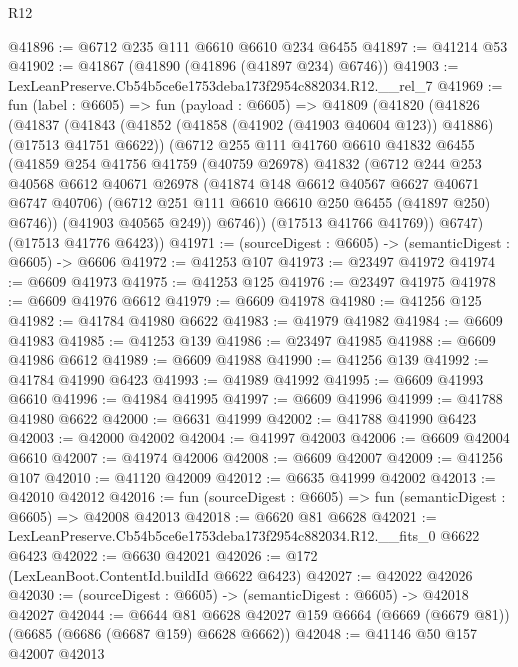 \begin{lexlean}{R12}
\begin{coremodule}
@41896 := @6712 @235 @111 @6610 @6610 @234 @6455
@41897 := @41214 @53
@41902 := @41867 (@41890 (@41896 (@41897 @234) @6746))
@41903 := LexLeanPreserve.Cb54b5ce6e1753deba173f2954c882034.R12.__rel_7
@41969 := fun (label : @6605) =>
  fun (payload : @6605) =>
  @41809
    (@41820
      (@41826
        (@41837
          (@41843
            (@41852 (@41858 (@41902 (@41903 @40604 @123)) @41886) (@17513 @41751 @6622))
            (@6712
              @255
              @111
              @41760
              @6610
              @41832
              @6455
              (@41859
                @254
                @41756
                @41759
                (@40759 @26978)
                @41832
                (@6712
                  @244
                  @253
                  @40568
                  @6612
                  @40671
                  @26978
                  (@41874 @148 @6612 @40567 @6627 @40671 @6747 @40706)
                  (@6712 @251 @111 @6610 @6610 @250 @6455 (@41897 @250) @6746))
                (@41903 @40565 @249))
              @6746))
          (@17513 @41766 @41769))
        @6747)
      (@17513 @41776 @6423))
@41971 := (sourceDigest : @6605) -> (semanticDigest : @6605) -> @6606
@41972 := @41253 @107
@41973 := @23497 @41972
@41974 := @6609 @41973
@41975 := @41253 @125
@41976 := @23497 @41975
@41978 := @6609 @41976 @6612
@41979 := @6609 @41978
@41980 := @41256 @125
@41982 := @41784 @41980 @6622
@41983 := @41979 @41982
@41984 := @6609 @41983
@41985 := @41253 @139
@41986 := @23497 @41985
@41988 := @6609 @41986 @6612
@41989 := @6609 @41988
@41990 := @41256 @139
@41992 := @41784 @41990 @6423
@41993 := @41989 @41992
@41995 := @6609 @41993 @6610
@41996 := @41984 @41995
@41997 := @6609 @41996
@41999 := @41788 @41980 @6622
@42000 := @6631 @41999
@42002 := @41788 @41990 @6423
@42003 := @42000 @42002
@42004 := @41997 @42003
@42006 := @6609 @42004 @6610
@42007 := @41974 @42006
@42008 := @6609 @42007
@42009 := @41256 @107
@42010 := @41120 @42009
@42012 := @6635 @41999 @42002
@42013 := @42010 @42012
@42016 := fun (sourceDigest : @6605) => fun (semanticDigest : @6605) => @42008 @42013
@42018 := @6620 @81 @6628
@42021 := LexLeanPreserve.Cb54b5ce6e1753deba173f2954c882034.R12.__fits_0 @6622 @6423
@42022 := @6630 @42021
@42026 := @172 (LexLeanBoot.ContentId.buildId @6622 @6423)
@42027 := @42022 @42026
@42030 := (sourceDigest : @6605) -> (semanticDigest : @6605) -> @42018 @42027
@42044 := @6644
    @81
    @6628
    @42027
    @159
    @6664
    (@6669 (@6679 @81))
    (@6685 (@6686 (@6687 @159) @6628 @6662))
@42048 := @41146 @50 @157 @42007 @42013

\end{coremodule}
\end{lexlean}
